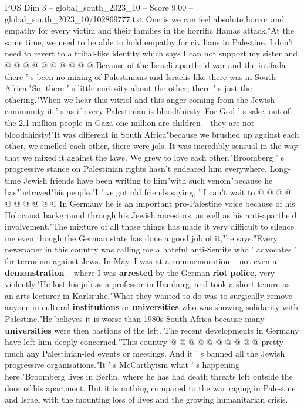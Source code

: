 \begin{textsample}{POS Dim 3 – global\_south\_2023\_10 – Score 9.00 – global\_south\_2023\_10/102869777.txt}
One is we can feel absolute horror and empathy for every victim and their families in the horrific Hamas attack."At the same time, we need to be able to hold empathy for civilians in Palestine.
I don't need to revert to a tribal-like identity which says I can not support my sister and @ @ @ @ @ @ @ @ @ @ Because of the Israeli apartheid war and the intifada there ' s been no mixing of Palestinians and Israelis like there was in South Africa."So, there ' s little curiosity about the other, there ' s just the othering."When we hear this vitriol and this anger coming from the Jewish community it ' s as if every Palestinian is bloodthirsty.
For God ' s sake, out of the 2.1 million people in Gaza one million are children -- they are not bloodthirsty!"It was different in South Africa"because we brushed up against each other, we smelled each other, there were jols.
It was incredibly sensual in the way that we mixed it against the laws.
We grew to love each other."Broomberg ' s progressive stance on Palestinian rights hasn't endeared him everywhere.
Long-time Jewish friends have been writing to him"with such venom"because he has"betrayed"his people."I ' ve got old friends saying, ' I can't wait to @ @ @ @ @ @ @ @ @ @ In Germany he is an important pro-Palestine voice because of his Holocaust background through his Jewish ancestors, as well as his anti-apartheid involvement."The mixture of all those things has made it very difficult to silence me even though the German state has done a good job of it,"he says."Every newspaper in this country was calling me a hateful anti-Semite who ' advocates ' for terrorism against Jews.
In May, I was at a commemoration -- not even a \textbf{demonstration} -- where I was \textbf{arrested} by the German \textbf{riot} \textbf{police}, very violently."He lost his job as a professor in Hamburg, and took a short tenure as an arts lecturer in Karlsruhe."What they wanted to do was to surgically remove anyone in cultural \textbf{institutions} or \textbf{universities} who was showing solidarity with Palestine."He believes it is worse than 1980s South Africa because many \textbf{universities} were then bastions of the left.
The recent developments in Germany have left him deeply concerned."This country @ @ @ @ @ @ @ @ @ @ pretty much any Palestinian-led events or meetings.
And it ' s banned all the Jewish progressive organisations."It ' s McCarthyism what ' s happening here."Broomberg lives in Berlin, where he has had death threats left outside the door of his apartment.
But it is nothing compared to the war raging in Palestine and Israel with the mounting loss of lives and the growing humanitarian crisis.

\end{textsample}
